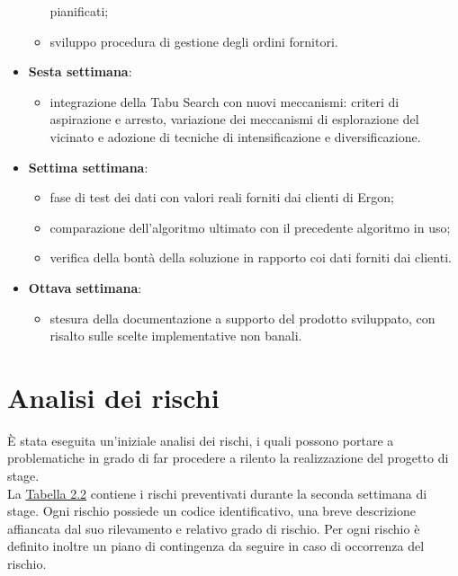 \begin{itemize}
\begin{itemize}
		pianificati;
			\item sviluppo procedura di gestione degli ordini fornitori.
		\end{itemize}
	\item \textbf{Sesta settimana}:
		\begin{itemize}
		\item integrazione della Tabu Search con nuovi meccanismi:
		criteri di aspirazione e arresto, variazione dei
		meccanismi di esplorazione del vicinato e adozione di
		tecniche di intensificazione e diversificazione.
		\end{itemize}
	\item \textbf{Settima settimana}:
		\begin{itemize}
		\item fase di test dei dati con valori reali forniti dai clienti di Ergon;
		\item comparazione dell'algoritmo ultimato con il precedente algoritmo in uso;
		\item verifica della bontà della soluzione in rapporto coi dati forniti dai clienti.
		\end{itemize}
	\item \textbf{Ottava settimana}:
		\begin{itemize}
		\item stesura della documentazione a supporto del prodotto sviluppato, con risalto sulle scelte implementative non banali.
		\end{itemize}
\end{itemize}

\pagebreak
\section{Analisi dei rischi}
È stata eseguita un'iniziale analisi dei rischi, i quali possono portare a problematiche in grado di far procedere a rilento la realizzazione del progetto di stage.\\
La \hyperref[rischi]{Tabella 2.2} contiene i rischi preventivati durante la seconda settimana di stage. Ogni rischio possiede un codice identificativo,
una breve descrizione affiancata dal suo rilevamento e relativo grado di rischio. Per ogni rischio è definito inoltre un piano di contingenza da seguire 
in caso di occorrenza del rischio.\\

